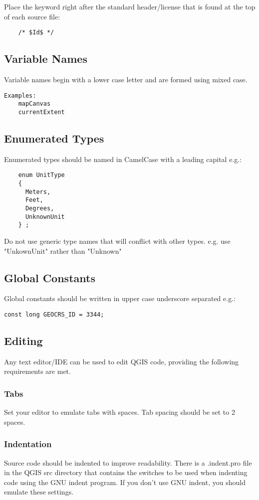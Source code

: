 Place the keyword right after the standard header/license that is found at the top of each source file:

\begin{verbatim}
	/* $Id$ */
\end{verbatim}

\subsection{Variable Names}
Variable names begin with a lower case letter and are formed using mixed case.

\begin{verbatim}
Examples:
	mapCanvas
	currentExtent
\end{verbatim}
\subsection{Enumerated Types}
Enumerated types should be named in CamelCase with a leading capital e.g.:

\begin{verbatim}
    enum UnitType
    {
      Meters,
      Feet,
      Degrees,
      UnknownUnit
    } ;
\end{verbatim}

Do not use generic type names that will conflict with other types. e.g. use "UnkownUnit" rather 
than "Unknown"

\subsection{Global Constants}
Global constants should be written in upper case underscore separated e.g.:

\begin{verbatim}
const long GEOCRS_ID = 3344;
\end{verbatim}

\subsection{Editing}
Any text editor/IDE can be used to edit QGIS code, providing the following requirements are met.

\subsubsection{Tabs}
Set your editor to emulate tabs with spaces. Tab spacing should be set to 2 spaces.

\subsubsection{Indentation}
Source code should be indented to improve readability. There is a .indent.pro file in the QGIS src directory that contains the switches to be used when indenting code using the GNU indent program. If you don't use GNU indent, you should emulate these settings.

